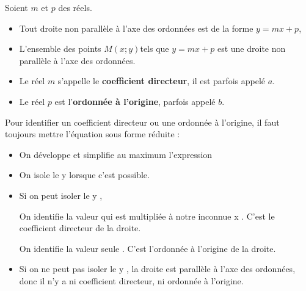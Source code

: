 \begin{prop}{}{}
   Soient $m$ et $p$ des réels.
   \begin{itemize}
      \item Tout droite non parallèle à l'axe des ordonnées est de la forme $y =mx+p$,
      \item L'ensemble des points $M(x;y)$tels que $y =mx+p$ est une droite non  parallèle à l'axe des ordonnées.
   \end{itemize}
\end{prop}

\begin{rem}{}{}
   \begin{itemize}
      \item  Le réel $m$ s'appelle le \textbf{coefficient directeur}, il est parfois appelé $a$.
      \item  Le réel $p$ est l'\textbf{ordonnée à l'origine}, parfois appelé $b$.
   \end{itemize}
\end{rem}

\smallskip

\begin{methode}{}{}
Pour identifier un coefficient directeur ou une ordonnée à l'origine, il faut toujours mettre l'équation sous forme réduite :
\begin{itemize}
\item On développe et simplifie au maximum l'expression
\item On \og isole le y \fg{} lorsque c'est possible.
\end{itemize}

\begin{itemize}
\item  Si on peut \og isoler le y \fg{} ,

\medskip
On identifie la valeur qui est multipliée à notre inconnue \og x \fg{}. C'est le coefficient directeur de la droite.

\medskip
On identifie la valeur \og seule \fg{} . C'est l'ordonnée à l'origine de la droite.
\end{itemize}

\begin{itemize}
\item  Si on ne peut pas \og isoler le y \fg{}, la droite est parallèle à l'axe des ordonnées, donc il n'y a ni coefficient directeur, ni ordonnée à l'origine.
\end{itemize}
\end{methode}

